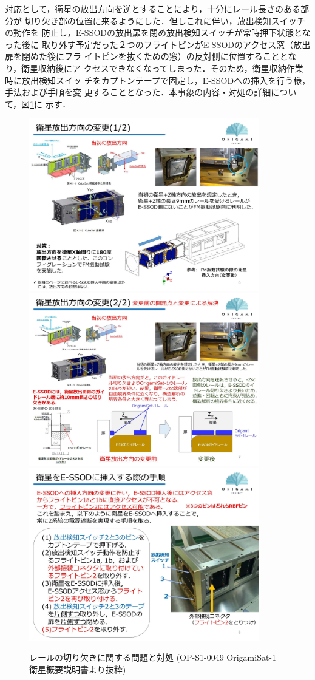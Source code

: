 対応として，衛星の放出方向を逆とすることにより，十分にレール長さのある部分が
切り欠き部の位置に来るようにした．但しこれに伴い，放出検知スイッチの動作を
防止し，E-SSODの放出扉を閉め放出検知スイッチが常時押下状態となった後に
取り外す予定だった２つのフライトピンがE-SSODのアクセス窓（放出扉を閉めた後にフラ
  イトピンを抜くための窓）の反対側に位置することとなり，衛星収納後にア
クセスできなくなってしまった．そのため，衛星収納作業時に放出検知スイッ
チをカプトンテープで固定し，E-SSODへの挿入を行う様，手法および手順を変
更することとなった．本事象の内容・対処の詳細について，図\ref{6_1_trouble2}に
示す．

\begin{figure}[htbp]
\centering
\includegraphics[width=10cm]{./06/fig/6-1_rail_trouble_2-1.jpg}
\includegraphics[width=10cm]{./06/fig/6-1_rail_trouble_2-2.jpg}
\includegraphics[width=10cm]{./06/fig/6-1_rail_trouble_2-3.jpg}
	\caption{レールの切り欠きに関する問題と対処 (OP-S1-0049
          OrigamiSat-1 衛星概要説明書より抜粋)}
	\label{6_1_trouble2}
\end{figure}

